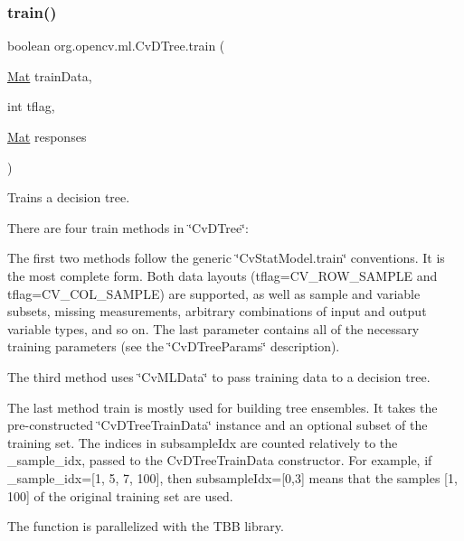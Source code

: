 \subsubsection{\texorpdfstring{train()}{train()}\hspace{0.1cm}{\footnotesize\ttfamily [2/2]}}
{\footnotesize\ttfamily boolean org.\+opencv.\+ml.\+Cv\+D\+Tree.\+train (\begin{DoxyParamCaption}\item[{\mbox{\hyperlink{classorg_1_1opencv_1_1core_1_1_mat}{Mat}}}]{train\+Data,  }\item[{int}]{tflag,  }\item[{\mbox{\hyperlink{classorg_1_1opencv_1_1core_1_1_mat}{Mat}}}]{responses }\end{DoxyParamCaption})}

Trains a decision tree.

There are four {\ttfamily train} methods in \char`\"{}\+Cv\+D\+Tree\char`\"{}\+:


\begin{DoxyItemize}
\item The first two methods follow the generic \char`\"{}\+Cv\+Stat\+Model.\+train\char`\"{} conventions. It is the most complete form. Both data layouts ({\ttfamily tflag=C\+V\+\_\+\+R\+O\+W\+\_\+\+S\+A\+M\+P\+LE} and {\ttfamily tflag=C\+V\+\_\+\+C\+O\+L\+\_\+\+S\+A\+M\+P\+LE}) are supported, as well as sample and variable subsets, missing measurements, arbitrary combinations of input and output variable types, and so on. The last parameter contains all of the necessary training parameters (see the \char`\"{}\+Cv\+D\+Tree\+Params\char`\"{} description). 
\item The third method uses \char`\"{}\+Cv\+M\+L\+Data\char`\"{} to pass training data to a decision tree. 
\item The last method {\ttfamily train} is mostly used for building tree ensembles. It takes the pre-\/constructed \char`\"{}\+Cv\+D\+Tree\+Train\+Data\char`\"{} instance and an optional subset of the training set. The indices in {\ttfamily subsample\+Idx} are counted relatively to the {\ttfamily \+\_\+sample\+\_\+idx}, passed to the {\ttfamily Cv\+D\+Tree\+Train\+Data} constructor. For example, if {\ttfamily \+\_\+sample\+\_\+idx=\mbox{[}1, 5, 7, 100\mbox{]}}, then {\ttfamily subsample\+Idx=\mbox{[}0,3\mbox{]}} means that the samples {\ttfamily \mbox{[}1, 100\mbox{]}} of the original training set are used. 
\end{DoxyItemize}

The function is parallelized with the T\+BB library.


